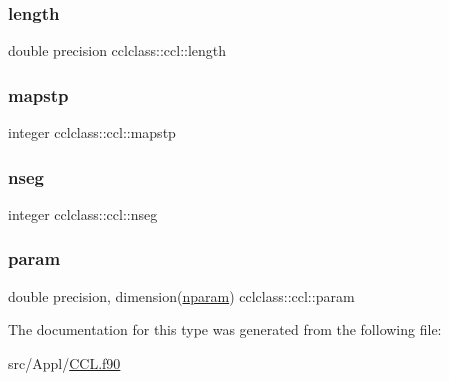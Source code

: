 \subsubsection{\texorpdfstring{length}{length}}
{\footnotesize\ttfamily double precision cclclass\+::ccl\+::length}

\mbox{\label{structcclclass_1_1ccl_a5d663b5eeafc5a924cfe6383143f9b0a}} 
\subsubsection{\texorpdfstring{mapstp}{mapstp}}
{\footnotesize\ttfamily integer cclclass\+::ccl\+::mapstp}

\mbox{\label{structcclclass_1_1ccl_a37e0a279ff69258948ddecf0a4c78045}} 
\subsubsection{\texorpdfstring{nseg}{nseg}}
{\footnotesize\ttfamily integer cclclass\+::ccl\+::nseg}

\mbox{\label{structcclclass_1_1ccl_a4b800d069f005c436b2295924f8f7bb9}} 
\subsubsection{\texorpdfstring{param}{param}}
{\footnotesize\ttfamily double precision, dimension(\mbox{\hyperlink{namespacecclclass_adeb399ff41e54cda7bdefa51063c0de6}{nparam}}) cclclass\+::ccl\+::param}



The documentation for this type was generated from the following file\+:\begin{DoxyCompactItemize}
\item 
src/\+Appl/\mbox{\hyperlink{_c_c_l_8f90}{C\+C\+L.\+f90}}\end{DoxyCompactItemize}
